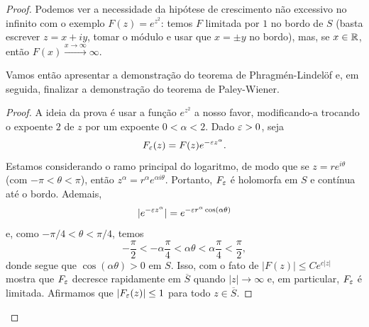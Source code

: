 \begin{proof}
            Podemos ver a necessidade da hipótese de crescimento não
            excessivo no infinito com o exemplo $F(z) = e^{z^2}$:
            temos $F$ limitada por $1$ no bordo de $S$ (basta escrever
            $z = x+iy$, tomar o módulo e usar que $x=\pm y$ no bordo),
            mas, se $x\in\mathbb{R}$, então $F(x)\xrightarrow{x\to\infty} \infty$.
            
            Vamos então apresentar a demonstração do teorema de
            Phragmén-Lindelöf e, em seguida, finalizar a demonstração do
            teorema de Paley-Wiener.
            
            \begin{proof}
                A ideia da prova é usar a função $e^{z^2}$ a nosso favor,
                modificando-a trocando o expoente $2$ de $z$ por um expoente
                $0<\alpha<2$. Dado $\varepsilon>0$, seja
                \begin{equation*}
                    F_{\varepsilon}(z) = F(z)e^{-\varepsilon z^{\alpha}}.
                \end{equation*}
                Estamos considerando o ramo principal do logaritmo, de modo
                que se $z = re^{i\theta}$ (com $-\pi < \theta < \pi$), então
                $z^{\alpha} = r^{\alpha}e^{\alpha i\theta}$. Portanto,
                $F_{\varepsilon}$ é holomorfa em $S$ e contínua até o bordo.
                Ademais,
                \begin{equation*}
                    |e^{-\varepsilon z^{\alpha}}| = e^{-\varepsilon r^{\alpha}\cos (\alpha\theta)}
                \end{equation*}
                e, como $-\pi /4 < \theta < \pi /4$, temos
                \begin{equation*}
                    -\frac{\pi}{2} < -\alpha\frac{\pi}{4} 
                    < \alpha\theta < \alpha\frac{\pi}{4} < \frac{\pi}{2},
                \end{equation*}
                donde segue que $\cos(\alpha\theta) > 0$ em $S$. Isso, com
                o fato de $|F(z)| \leq Ce^{c|z|}$ mostra que $F_{\varepsilon}$ decresce
                rapidamente em $\overline{S}$ quando $|z|\to\infty$ e, em
                particular, $F_{\varepsilon}$ é limitada. Afirmamos que 
                $|F_{\varepsilon}(z)| \leq 1$ para todo $z\in\overline{S}$.
                

\end{proof}
\end{proof}
